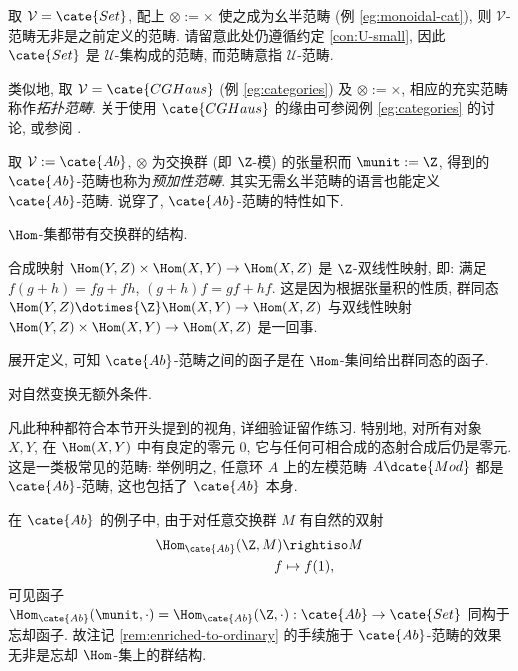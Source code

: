 \begin{example}
	取 $\mathcal{V} = \cate{Set}$, 配上 $\otimes := \times$ 使之成为幺半范畴 (例 \ref{eg:monoidal-cat}), 则 $\mathcal{V}$-范畴无非是之前定义的范畴. 请留意此处仍遵循约定 \ref{con:U-small}, 因此 $\cate{Set}$ 是 $\mathcal{U}$-集构成的范畴, 而范畴意指 $\mathcal{U}$-范畴.
\end{example}

\begin{example}
	类似地, 取 $\mathcal{V} = \cate{CGHaus}$ (例 \ref{eg:categories}) 及 $\otimes := \times$, 相应的充实范畴称作\emph{拓扑范畴}. 关于使用 $\cate{CGHaus}$ 的缘由可参阅例 \ref{eg:categories} 的讨论, 或参阅 \cite[Chapter 5]{May99}. 
\end{example}

\begin{example}\label{eg:Ab-cat}
	取 $\mathcal{V} := \cate{Ab}$, $\otimes$ 为交换群 (即 $\Z$-模) 的张量积而 $\munit := \Z$, 得到的 $\cate{Ab}$-范畴也称为\emph{预加性范畴}. 其实无需幺半范畴的语言也能定义 $\cate{Ab}$-范畴. 说穿了, $\cate{Ab}$-范畴的特性如下.
	\begin{compactitem}
		\item $\Hom$-集都带有交换群的结构.
		\item 合成映射 $\Hom(Y, Z) \times \Hom(X, Y) \to \Hom(X, Z)$ 是 $\Z$-双线性映射, 即: 满足 $f(g+h) = fg+ fh$, $(g+h)f = gf + hf$. 这是因为根据张量积的性质, 群同态 $\Hom(Y,Z) \dotimes{\Z} \Hom(X, Y) \to \Hom(X, Z)$ 与双线性映射 $\Hom(Y, Z) \times \Hom(X, Y) \to \Hom(X, Z)$ 是一回事.
		\item 展开定义, 可知 $\cate{Ab}$-范畴之间的函子是在 $\Hom$-集间给出群同态的函子.
		\item 对自然变换无额外条件.
	\end{compactitem}
	 凡此种种都符合本节开头提到的视角, 详细验证留作练习. 特别地, 对所有对象 $X, Y$, 在 $\Hom(X, Y)$ 中有良定的零元 $0$, 它与任何可相合成的态射合成后仍是零元. 这是一类极常见的范畴: 举例明之, 任意环 $A$ 上的左模范畴 $A\dcate{Mod}$ 都是 $\cate{Ab}$-范畴, 这也包括了 $\cate{Ab}$ 本身.

	在 $\cate{Ab}$ 的例子中, 由于对任意交换群 $M$ 有自然的双射
	\begin{align*}
		\Hom_{\cate{Ab}}(\Z, M) & \rightiso M \\
		f & \mapsto f(1),
	\end{align*}
	可见函子 $\Hom_{\cate{Ab}}(\munit, \cdot) = \Hom_{\cate{Ab}}(\Z, \cdot): \cate{Ab} \to \cate{Set}$ 同构于忘却函子.  故注记 \ref{rem:enriched-to-ordinary} 的手续施于 $\cate{Ab}$-范畴的效果无非是忘却 $\Hom$-集上的群结构.
\end{example}

